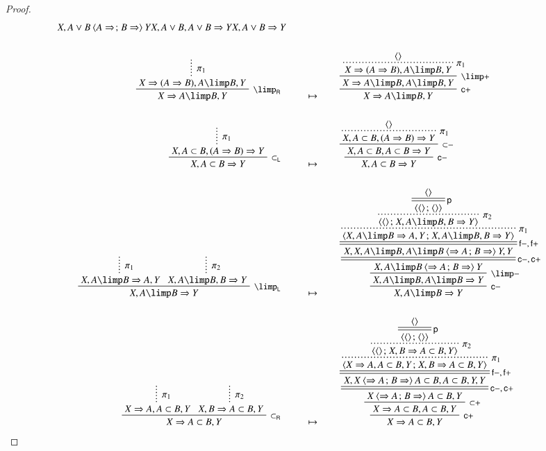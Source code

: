 \begin{proof}
\begin{align*}
{{    {X, A \lor B \piq{A \seq \sep B \seq} Y}}
    {X, A \lor B, A \lor B \seq Y}}
    {X, A \lor B \seq Y}
    \\\\
    \R[\rsf{\limp_R}]
      {\summ[$\pi_1$]{X \seq (A \seq B), A \limp B, Y}}
      {X \seq A \limp B, Y}
    &\mt
    \R[\rsf{c{+}}]
    {\R[\rsf{{\limp}{+}}]
    {\prftree[r][dotted]{$\pi_1$}
    {\piq{}}
    {X \seq (A \seq B), A \limp B, Y}}
    {X \seq A \limp B, A \limp B, Y}}
    {X \seq A \limp B, Y}
    \\\\
    \R[\rsf{\lsub_L}]
      {\summ[$\pi_1$]{X, A \lsub B, (A \seq B) \seq Y}}
      {X, A \lsub B \seq Y}
    &\mt
    \R[\rsf{c{-}}]
    {\R[\rsf{{\lsub}{-}}]
    {\prftree[r][dotted]{$\pi_1$}
    {\piq{}}
    {X, A \lsub B, (A \seq B) \seq Y}}
    {X, A \lsub B, A \lsub B \seq Y}}
    {X, A \lsub B \seq Y}
    \\\\
    \R[\rsf{\limp_L}]
      {\summ[$\pi_1$]{X, A \limp B \seq A, Y}}
      {\summ[$\pi_2$]{X, A \limp B, B \seq Y}}
      {X, A \limp B \seq Y}
    &\mt
    \R[\rsf{c{-}}]
    {\R[\rsf{{\limp}{-}}]
    {\prftree[r][d]{\rsf{c{-},c{+}}}
    {\prftree[r][d]{\rsf{f{-},f{+}}}
    {\prftree[r][dotted]{$\pi_1$}
    {\prftree[r][dotted]{$\pi_2$}
    {\prftree[r][d]{\rsf{p}}
    {\piq{}}
    {\piq{\piq{} \sep \piq{}}}}
    {\piq{\piq{} \sep X, A \limp B, B \seq Y}}}
    {\piq{X, A \limp B \seq A, Y \sep X, A \limp B, B \seq Y}}}
    {X, X, A \limp B, A \limp B \piq{\seq A \sep B \seq} Y, Y}}
    {X, A \limp B \piq{\seq A \sep B \seq} Y}}
    {X, A \limp B, A \limp B \seq Y}}
    {X, A \limp B \seq Y}
    \\\\
    \R[\rsf{\lsub_R}]
      {\summ[$\pi_1$]{X \seq A, A \lsub B, Y}}
      {\summ[$\pi_2$]{X, B \seq A \lsub B, Y}}
      {X \seq A \lsub B, Y}
    &\mt
    \R[\rsf{c{+}}]
    {\R[\rsf{{\lsub}{+}}]
    {\prftree[r][d]{\rsf{c{-},c{+}}}
    {\prftree[r][d]{\rsf{f{-},f{+}}}
    {\prftree[r][dotted]{$\pi_1$}
    {\prftree[r][dotted]{$\pi_2$}
    {\prftree[r][d]{\rsf{p}}
    {\piq{}}
    {\piq{\piq{} \sep \piq{}}}}
    {\piq{\piq{} \sep X, B \seq A \lsub B, Y}}}
    {\piq{X \seq A, A \lsub B, Y \sep X, B \seq A \lsub B, Y}}}
    {X, X \piq{\seq A \sep B \seq} A \lsub B, A \lsub B, Y, Y}}
    {X \piq{\seq A \sep B \seq} A \lsub B, Y}}
    {X \seq A \lsub B, A \lsub B, Y}}
    {X \seq A \lsub B, Y}
  \end{align*}
\end{proof}

